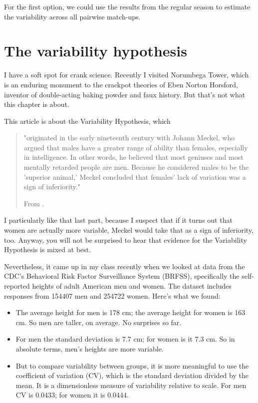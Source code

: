 \documentclass[12pt]{book}
\begin{document}
For the first option, we could use the results from the regular
season to estimate the variability across all pairwise match-ups.


\chapter{The variability hypothesis}

I have a soft spot for crank science.  Recently I visited Norumbega
Tower, which is an enduring monument to the crackpot theories of Eben
Norton Horsford, inventor of double-acting baking powder and faux
history.  But that's not what this chapter is about.

This article is about the Variability Hypothesis, which

\begin{quote}
"originated
in the early nineteenth century with Johann Meckel, who argued that
males have a greater range of ability than females, especially in
intelligence. In other words, he believed that most geniuses and most
mentally retarded people are men. Because he considered males to be
the 'superior animal,' Meckel concluded that females' lack of
variation was a sign of inferiority."

From \url{}.
\end{quote}

I particularly like that last part, because I suspect that if it turns
out that women are actually more variable, Meckel would take that as a
sign of inferiority, too.  Anyway, you will not be surprised to hear
that evidence for the Variability Hypothesis is mixed at best.

Nevertheless, it came up in my class recently when we looked at data
from the CDC's Behavioral Risk Factor Surveillance System (BRFSS),
specifically the self-reported heights of adult American men and women.
The dataset includes responses from 154407 men and 254722 women.
Here's what we found:

\begin{itemize}

\item The average height for men is 178 cm; the average height for
  women is 163 cm.  So men are taller, on average.  No surprises so
  far.

\item For men the standard deviation is 7.7 cm; for women is it 7.3
  cm.  So in absolute terms, men's heights are more variable.

\item But to compare
variability between groups, it is more meaningful to use the
coefficient of variation (CV), which is the standard deviation divided
by the mean.  It is a dimensionless measure of variability relative to
scale.  For men CV is 0.0433; for women it is 0.0444.

\end{itemize}
\end{document}
